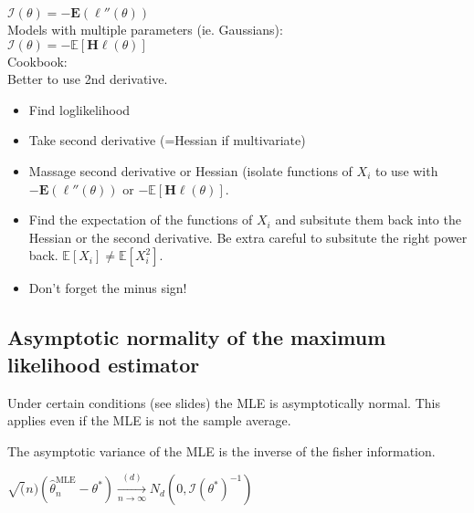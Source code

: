 $\mathcal{I}(\theta ) = - \mathbf{E}(\ell ''(\theta ))$\\

Models with multiple parameters (ie. Gaussians):\\

$\mathcal{I}(\theta ) = -\mathbb E\left[\mathbf{H}\ell (\theta )\right]$\\

Cookbook:\\

Better to use 2nd derivative.\\

\begin{itemize}
  \item Find loglikelihood
  \item Take second derivative (=Hessian if multivariate)
  \item Massage second derivative or Hessian (isolate functions of $X_i$ to use with $- \mathbf{E}(\ell ''(\theta ))$ or $-\mathbb E\left[\mathbf{H}\ell (\theta )\right]$.
  \item Find the expectation of the functions of $X_i$ and subsitute them back into the Hessian or the second derivative. Be extra careful to subsitute the right power back. $\mathbb{E}[X_i] \neq \mathbb{E}[X_i^2]$.
  \item Don't forget the minus sign!
\end{itemize}

\subsection*{Asymptotic normality of the maximum likelihood estimator}

Under certain conditions (see slides) the MLE is asymptotically normal. This applies even if the MLE is not the sample average.

The asymptotic variance of the MLE is the inverse of the fisher information.

$\sqrt(n)(\widehat{\theta }_ n^{\text {MLE}} - \theta^*) \xrightarrow[n \rightarrow \infty]{(d)} N_d(0,\mathcal{I}(\theta^* )^{-1})$\\